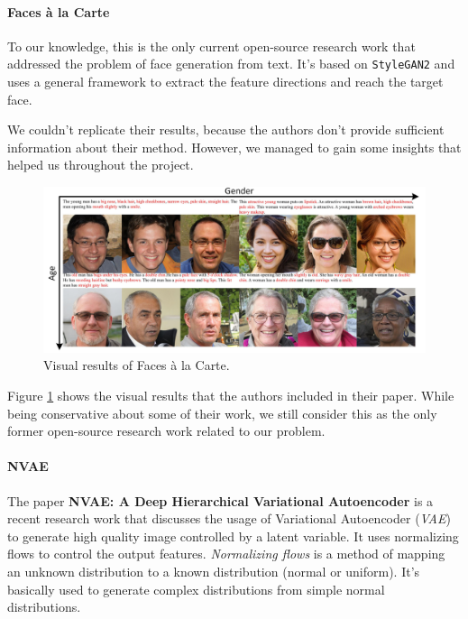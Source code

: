 \paragraph{Faces à la Carte}
To our knowledge, this \cite{wang2020faces} is the only current open-source research work that addressed the problem of face generation from text. It's based on \texttt{StyleGAN2} and uses a general framework to extract the feature directions and reach the target face.

We couldn't replicate their results, because the authors don't provide sufficient information about their method. However, we managed to gain some insights that helped us throughout the project.

\begin{figure}[H]
    \centering
    \includegraphics[width=\textwidth]{images/face-carte.png}
    \caption{Visual results of Faces à la Carte.}
    \label{fig:face_carte}
\end{figure}

Figure \ref{fig:face_carte} shows the visual results that the authors included in their paper. While being conservative about some of their work, we still consider this as the only former open-source research work related to our problem.

\paragraph{NVAE}
The paper \textbf{NVAE: A Deep Hierarchical Variational Autoencoder} \cite{vahdat2021nvae} is a recent research work that discusses the usage of Variational Autoencoder (\emph{VAE}) to generate high quality image controlled by a latent variable. It uses normalizing flows to control the output features. \emph{Normalizing flows} is a method of mapping an unknown distribution to a known distribution (normal or uniform). It's basically used to generate complex distributions from simple normal distributions.

